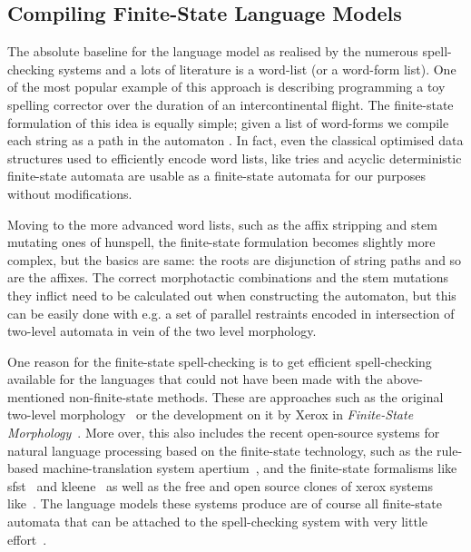 \documentclass[a4paper,12pt]{article}
\begin{document}
\subsection{Compiling Finite-State Language Models}
\label{subsec:language-models}

The absolute baseline for the language model as realised by the numerous
spell-checking systems and a lots of literature is a word-list (or a word-form
list). One of the most popular example of this approach
is \cite[]{norvig/2010} describing programming a toy spelling corrector over
the duration of an intercontinental flight. The finite-state formulation of
this idea is equally simple; given a list of word-forms we compile each string
as a path in the automaton \cite[]{pirinen2012effects}. In fact, even the
classical optimised data structures used to efficiently encode word lists, like
tries and acyclic deterministic finite-state automata are usable as
a finite-state automata for our purposes without modifications.

Moving to the more advanced word lists, such as the affix stripping and stem
mutating ones of hunspell, the finite-state formulation becomes slightly more
complex, but the basics are same: the roots are disjunction of string paths and
so are the affixes. The correct morphotactic combinations and the stem
mutations they inflict need to be calculated out when constructing the
automaton, but this can be easily done with e.g. a set of parallel restraints
encoded in intersection of two-level automata \cite[]{pirinen2010creating} in
vein of the two level morphology.

One reason for the finite-state spell-checking is to get efficient
spell-checking available for the languages that could not have been made with
the above-mentioned non-finite-state methods. These are approaches such as the
original two-level morphology~\cite[]{koskenniemi/1983} or the development on
it by Xerox in \emph{Finite-State Morphology}~\cite[]{beesley2003finite}.  More
over, this also includes the recent open-source systems for natural language
processing based on the finite-state technology, such as the rule-based
machine-translation system apertium~\cite[]{apertium2010}, and the finite-state
formalisms like sfst~\cite[]{schmid2006programming} and
kleene~\cite[]{beesley2012kleene} as well as the free and open source clones of
xerox systems like~\cite{hfst/2012/cla,hulden2009foma}.  The language models
these systems produce are of course all finite-state automata that can be
attached to the spell-checking system with very little
effort~\cite[e.g.][]{pirinen2012compiling}.
\end{document}

